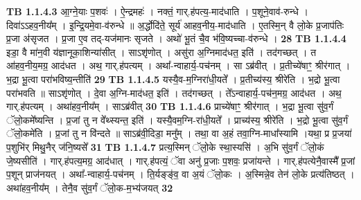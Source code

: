 \documentclass[17pt]{extarticle}
\begin{document}
                  \newline
                                \textbf{ TB 1.1.4.3} \newline
                  आ॒ग्ने॒याः प॒शवः॑ । ऐ॒न्द्रमहः॑ । नक्तं॒ गार्.ह॑पत्य॒-माद॑धाति । प॒शूने॒वाव॑-रुन्धे । दिवा॑ऽऽहव॒नीय᳚म् । इ॒न्द्रि॒यमे॒वा-व॑रुन्धे ॥ अ॒र्द्धोदि॑ते॒ सूर्य॑ आहव॒नीय॒-माद॑धाति । ए॒तस्मि॒न् वै लो॒के प्र॒जाप॑तिः प्र॒जा अ॑सृजत । प्र॒जा ए॒व तद्-यज॑मानः सृजते । अथो॑ भू॒तं चै॒व भ॑वि॒ष्यच्चा-व॑रुन्धे । \textbf{ 28} \newline
                  \newline
                                \textbf{ TB 1.1.4.4} \newline
                  इडा॒ वै मा॑न॒वी य॑ज्ञानूका॒शिन्या॑सीत् । साऽशृ॑णोत् । असु॑रा अ॒ग्निमाद॑धत॒ इति॑ । तद॑गच्छत् । त आ॑हव॒नीय॒मग्र॒ आद॑धत । अथ॒ गार्.ह॑पत्यम् । अथा᳚-न्वाहार्य॒-पच॑नम् । सा ऽब्र॑वीत् । प्र॒तीच्ये॑षाꣳ॒॒ श्रीर॑गात् । भ॒द्रा भू॒त्वा परा॑भविष्य॒न्तीति॑ \textbf{ 29} \newline
                  \newline
                                \textbf{ TB 1.1.4.5} \newline
                  यस्यै॒व-म॒ग्निरा॑धी॒यते᳚ । प्र॒तीच्य॑स्य॒ श्रीरे॑ति । भ॒द्रो भू॒त्वा परा॑भवति ॥ साऽशृ॑णोत् । दे॒वा अ॒ग्नि-माद॑धत॒ इति॑ । तद॑गच्छत् । ते᳚ऽन्वाहार्य॒-पच॑न॒मग्र॒ आद॑धत । अथ॒ गार्.ह॑पत्यम् । अथा॑हव॒नीय᳚म् । साऽब्र॑वीत् \textbf{ 30} \newline
                  \newline
                                \textbf{ TB 1.1.4.6} \newline
                  प्राच्ये॑षाꣳ॒॒ श्रीर॑गात् । भ॒द्रा भू॒त्वा सु॑व॒र्गं ॅलो॒कमे᳚ष्यन्ति । प्र॒जां तु न वे᳚थ्स्यन्त॒ इति॑ । यस्यै॒वम॒ग्नि-रा॑धी॒यते᳚ । प्राच्य॑स्य॒ श्रीरे॑ति । भ॒द्रो भू॒त्वा सु॑व॒र्गं ॅलो॒कमे॑ति । प्र॒जां तु न वि॑न्दते ॥ साऽब्र॑वी॒दिडा॒ मनु᳚म् । तथा॒ वा अ॒हं तवा॒ग्नि-माधा᳚स्यामि ।यथा॒ प्र प्र॒जया॑ प॒शुभि॑र् मिथु॒नैर् ज॑नि॒ष्यसे᳚ \textbf{ 31} \newline
                  \newline
                                \textbf{ TB 1.1.4.7} \newline
                  प्रत्य॒स्मिन् ॅलो॒के स्था॒स्यसि॑ । अ॒भि सु॑व॒र्गं ॅलो॒कं जे॒ष्यसीति॑ । गार्.ह॑पत्य॒मग्र॒ आद॑धात् । गार्.ह॑पत्यं॒ ॅवा अनु॑ प्र॒जाः प॒शवः॒ प्रजा॑यन्ते । गार्.ह॑पत्येनै॒वास्मै᳚ प्र॒जां प॒शून् प्राज॑नयत् । अथा᳚-न्वाहार्य॒-पच॑नम् । ति॒र्यङ्ङ्॑व॒ वा अ॒यं ॅलो॒कः । अ॒स्मिन्ने॒व तेन॑ लो॒के प्रत्य॑तिष्ठत् । अथा॑हव॒नीय᳚म् । तेनै॒व सु॑व॒र्गं ॅलो॒क-म॒भ्य॑जयत् \textbf{ 32} \newline
\end{document}
